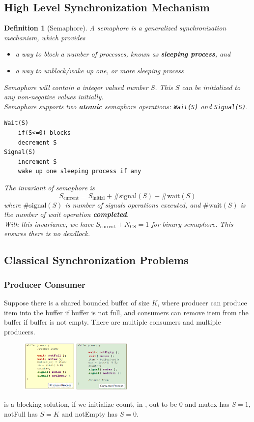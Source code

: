 \documentclass[11pt]{article}
\newtheorem{definition}{Definition}[section]
\theoremstyle{definition}
\begin{document}
\subsection{High Level Synchronization Mechanism}
\begin{definition}[Semaphore]
\normalfont A semaphore is a generalized synchronization mechanism, which provides 
\begin{itemize}[itemsep=0pt]
  \item a way to block a number of processes, known as \textbf{sleeping process}, and 
  \item a way to unblock/wake up one, or more sleeping process
\end{itemize}
Semaphore will contain a integer valued number $S$. This $S$ can be initialized to any non-negative values initially.\\
Semaphore supports two \textbf{atomic} semaphore operations: \texttt{Wait(S)} and \texttt{Signal(S)}.
\begin{verbatim}
Wait(S)
    if(S<=0) blocks
    decrement S
Signal(S)
    increment S
    wake up one sleeping process if any
\end{verbatim}
The invariant of semaphore is
\[
S_\text{current} = S_\text{initial} + \#\text{signal}(S) - \#\text{wait}(S)
\]
where $\#\text{signal}(S)$ is number of signals operations executed, and $\#\text{wait}(S)$ is the number of wait operation \textbf{completed}.\\
With this invariance, we have $S_\text{current}+N_\text{CS}=1$ for binary semaphore. This ensures there is no deadlock.
\end{definition}
\subsection{Classical Synchronization Problems}
\subsubsection{Producer Consumer}
Suppose there is a shared bounded buffer of size $K$, where producer can produce item into the buffer if buffer is not full, and consumers can remove item from the buffer if buffer is not empty. There are multiple consumers and multiple producers.
\begin{figure}[h]
\centering
\includegraphics[width=0.5\textwidth]{5_1.png}
\end{figure}
is a blocking solution, if we initialize count, in , out to be $0$ and mutex has $S=1$, notFull has $S=K$ and notEmpty has $S=0$.
\end{document}
